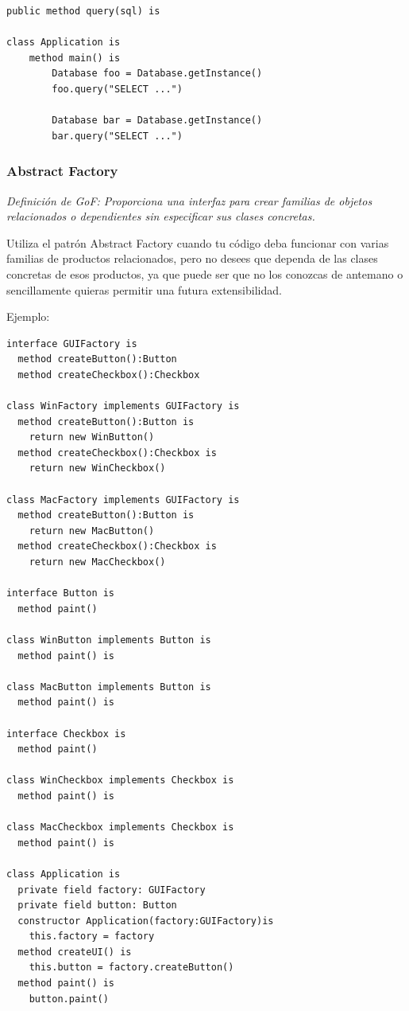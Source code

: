 \documentclass{article}
\begin{document}
\begin{multicols}{2}
\begin{verbatim}
public method query(sql) is

class Application is
    method main() is
        Database foo = Database.getInstance()
        foo.query("SELECT ...")
        
        Database bar = Database.getInstance()
        bar.query("SELECT ...")

\end{verbatim}

\subsubsection{Abstract Factory}
\textit{Definición de GoF: Proporciona una interfaz para crear familias de objetos relacionados o dependientes sin especificar sus clases concretas.}

Utiliza el patrón Abstract Factory cuando tu código deba funcionar con varias familias de productos relacionados, pero no desees que dependa de las clases concretas de esos productos, ya que puede ser que no los conozcas de antemano o sencillamente quieras permitir una futura extensibilidad.

Ejemplo:
\begin{verbatim}
interface GUIFactory is
  method createButton():Button
  method createCheckbox():Checkbox

class WinFactory implements GUIFactory is
  method createButton():Button is
    return new WinButton()
  method createCheckbox():Checkbox is
    return new WinCheckbox()

class MacFactory implements GUIFactory is
  method createButton():Button is
    return new MacButton()
  method createCheckbox():Checkbox is
    return new MacCheckbox()

interface Button is
  method paint()

class WinButton implements Button is
  method paint() is

class MacButton implements Button is
  method paint() is

interface Checkbox is
  method paint()

class WinCheckbox implements Checkbox is
  method paint() is

class MacCheckbox implements Checkbox is
  method paint() is

class Application is
  private field factory: GUIFactory
  private field button: Button
  constructor Application(factory:GUIFactory)is
    this.factory = factory
  method createUI() is
    this.button = factory.createButton()
  method paint() is
    button.paint()


\end{verbatim}
\end{multicols}
\end{document}
